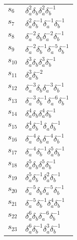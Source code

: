 \documentclass{article}
\begin{document}
\begin{center}
\begin{tabular}{ll}
$s_{6}$ & $\delta_a^{2}\delta_b^{}\delta_a^{2}\delta_b^{-1}$ \\
$s_{7}$ & $\delta_a^{2}\delta_b^{-1}\delta_a^{-1}\delta_b^{-1}$ \\
$s_{8}$ & $\delta_a^{-2}\delta_b^{}\delta_a^{-2}\delta_b^{-1}$ \\
$s_{9}$ & $\delta_a^{-2}\delta_b^{-1}\delta_a^{-5}\delta_b^{-1}$ \\
$s_{10}$ & $\delta_a^{3}\delta_b^{}\delta_a^{3}\delta_b^{-1}$ \\
$s_{11}$ & $\delta_a^{3}\delta_b^{-2}$ \\
$s_{12}$ & $\delta_a^{-3}\delta_b^{}\delta_a^{-3}\delta_b^{-1}$ \\
$s_{13}$ & $\delta_a^{-3}\delta_b^{-1}\delta_a^{-6}\delta_b^{-1}$ \\
$s_{14}$ & $\delta_a^{4}\delta_b^{}\delta_a^{4}\delta_b^{-1}$ \\
$s_{15}$ & $\delta_a^{4}\delta_b^{-1}\delta_a^{}\delta_b^{-1}$ \\
$s_{16}$ & $\delta_a^{-4}\delta_b^{}\delta_a^{-4}\delta_b^{-1}$ \\
$s_{17}$ & $\delta_a^{-4}\delta_b^{-1}\delta_a^{5}\delta_b^{-1}$ \\
$s_{18}$ & $\delta_a^{5}\delta_b^{}\delta_a^{5}\delta_b^{-1}$ \\
$s_{19}$ & $\delta_a^{5}\delta_b^{-1}\delta_a^{2}\delta_b^{-1}$ \\
$s_{20}$ & $\delta_a^{-5}\delta_b^{}\delta_a^{-5}\delta_b^{-1}$ \\
$s_{21}$ & $\delta_a^{-5}\delta_b^{-1}\delta_a^{4}\delta_b^{-1}$ \\
$s_{22}$ & $\delta_a^{6}\delta_b^{}\delta_a^{-6}\delta_b^{-1}$ \\
$s_{23}$ & $\delta_a^{6}\delta_b^{-1}\delta_a^{3}\delta_b^{-1}$ \\
\bottomrule
\end{tabular}
\end{center}

\thispagestyle{empty}
\end{document}
